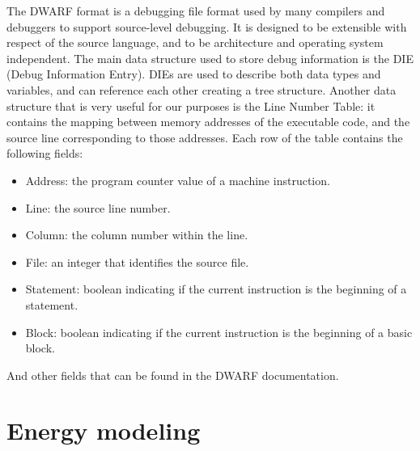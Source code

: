 The DWARF format \cite{dwarf} is a debugging file format used by many compilers and debuggers to support source-level debugging. It is designed to be extensible with respect of the source language, and to be architecture and operating system independent. \newline
The main data structure used to store debug information is the DIE (Debug Information Entry). DIEs are used to describe both data types and variables, and can reference each other creating a tree structure. \newline
Another data structure that is very useful for our purposes is the Line Number Table: it contains the mapping between memory addresses of the executable code, and the source line corresponding to those addresses.\newline
Each row of the table contains the following fields:
\begin{itemize}
\item Address: the program counter value of a machine instruction.
\item Line: the source line number.
\item Column: the column number within the line.
\item File: an integer that identifies the source file.
\item Statement: boolean indicating if the current instruction is the beginning of a statement.
\item Block: boolean indicating if the current instruction is the beginning of a basic block.
\end{itemize}
And other fields that can be found in the DWARF documentation.



\section{Energy modeling}
